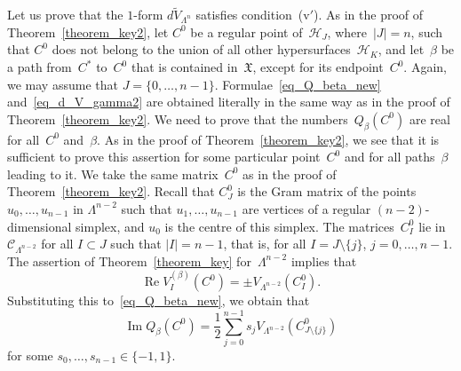 \documentclass[reqno,tbtags,12pt]{amsart}
\numberwithin{equation}{section}
\newcommand{\CH}{\mathcal{H}}
\newcommand{\CC}{\mathcal{C}}
\newcommand{\FX}{\mathfrak{X}}
\newcommand{\tV}{\widetilde{V}}
\renewcommand{\Im}{\mathop{\mathrm{Im}}\nolimits}
\renewcommand{\Re}{\mathop{\mathrm{Re}}\nolimits}
\theoremstyle{definition}
\begin{document}
Let us prove that the $1$-form $d\tV_{\Lambda^n}$ satisfies condition~(v${}'$). As in the proof of Theorem~\ref{theorem_key2}, let $C^0$ be a regular point of~$\CH_J$, where~$|J|=n$, such that $C^0$ does not belong to the union of all other hypersurfaces~$\CH_K$, and let~$\beta$ be a path from~$C^*$ to~$C^0$ that is contained in~$\FX$, except for its endpoint~$C^0$. Again, we may assume that $J=\{0,\ldots,n-1\}$. Formulae~\eqref{eq_Q_beta_new} and~\eqref{eq_d_V_gamma2} are obtained literally in the same way as in the proof of Theorem~\ref{theorem_key2}. We need to prove that the numbers~$Q_{\beta}(C^0)$ are real for all~$C^0$ and~$\beta$. As in the proof of Theorem~\ref{theorem_key2}, we see that it is sufficient to prove this assertion for some particular point~$C^0$ and for all paths~$\beta$ leading to it. We take the same matrix~$C^0$ as in the proof of Theorem~\ref{theorem_key2}. Recall that $C^0_J$ is the Gram matrix of the points $u_0,\ldots,u_{n-1}$ in $\Lambda^{n-2}$ such that $u_1,\ldots,u_{n-1}$ are vertices of a regular $(n-2)$-dimensional simplex, and  $u_0$ is the centre of this simplex. 
The matrices~$C_I^0$ lie in~$\CC_{\Lambda^{n-2}}$ for all $I\subset J$ such that $|I|=n-1$, that is, for all $I=J\setminus\{j\}$, $j=0,\ldots,n-1$. The assertion of Theorem~\ref{theorem_key} for~$\Lambda^{n-2}$ implies that    
$$\Re V^{(\beta)}_{I}(C^0)=\pm V_{\Lambda^{n-2}}(C^0_I).$$ 
Substituting this to~\eqref{eq_Q_beta_new}, we obtain that
\begin{equation}\label{eq_ImQ}
\Im Q_{\beta}(C^0)=\frac{1}{2}\sum_{j=0}^{n-1}s_j V_{\Lambda^{n-2}}(C^0_{J\setminus\{j\}})
\end{equation}
for some $s_0,\ldots,s_{n-1}\in\{-1,1\}$. 
\end{document}

